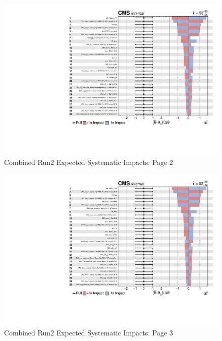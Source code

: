 \newpage
\begin{figure}[h!]
    \centering
    \includegraphics[page=2, width=\textwidth]{Sections/HHWWgg/images/Impacts/HHWWgg_Impacts_expected.pdf}
    \caption{Combined Run2 Expected Systematic Impacts: Page 2}
    \label{fig:Impacts_Run2_expected-2}
\end{figure}

\newpage
\begin{figure}[h!]
    \centering
    \includegraphics[page=3, width=\textwidth]{Sections/HHWWgg/images/Impacts/HHWWgg_Impacts_expected.pdf}
    \caption{Combined Run2 Expected Systematic Impacts: Page 3}
    \label{fig:Impacts_Run2_expected-3}
\end{figure}

